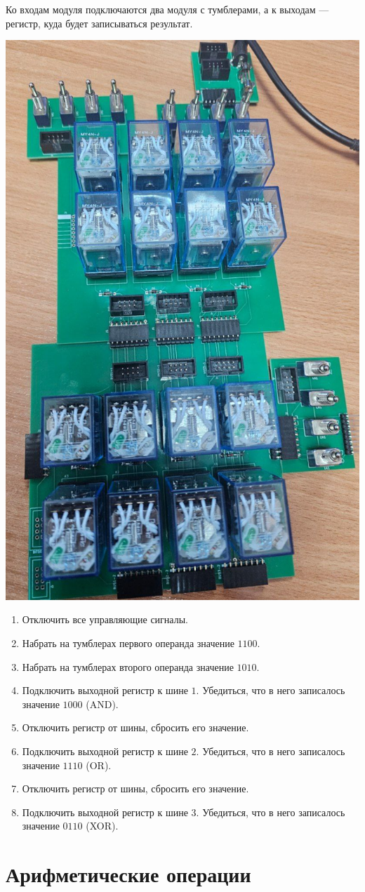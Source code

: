 Ко входам модуля подключаются два модуля с тумблерами, а к выходам --- регистр,
куда будет записываться результат.


\includegraphics[width=0.5\columnwidth]{photo/logic.jpg}

\begin{enumerate}
    \item Отключить все управляющие сигналы.
    \item Набрать на тумблерах первого операнда значение $1100$.
    \item Набрать на тумблерах второго операнда значение $1010$.
    \item Подключить выходной регистр к шине $1$. Убедиться, что в него записалось значение $1000$ (AND).
    \item Отключить регистр от шины, сбросить его значение.
    \item Подключить выходной регистр к шине $2$. Убедиться, что в него записалось значение $1110$ (OR).
    \item Отключить регистр от шины, сбросить его значение.
    \item Подключить выходной регистр к шине $3$. Убедиться, что в него записалось значение $0110$ (XOR).
\end{enumerate}




\section{Арифметические операции}

